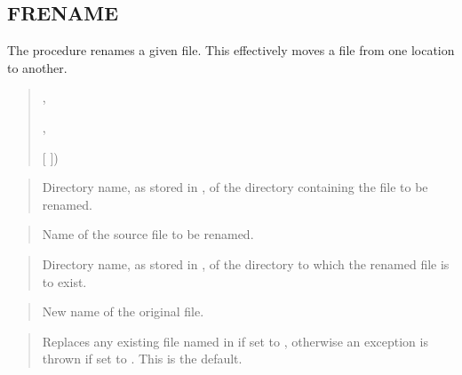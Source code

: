 \documentclass[letterpaper,10pt,english,openany,oneside]{sphinxmanual}
\begin{document}
\subsection{FRENAME}
\label{\detokenize{utl_file:frename}}
The  procedure renames a given file. This effectively moves a
file from one location to another.
\begin{quote}

,

\begin{DUlineblock}{0em}
\item[] ,
\end{DUlineblock}

\begin{DUlineblock}{0em}
\item[] {[}  {]})
\end{DUlineblock}
\end{quote}


\begin{quote}

Directory name, as stored in , of the
directory containing the file to be renamed.
\end{quote}

\begin{quote}

Name of the source file to be renamed.
\end{quote}

\begin{quote}

Directory name, as stored in , of the
directory to which the renamed file is to exist.
\end{quote}

\begin{quote}

New name of the original file.
\end{quote}

\begin{quote}

Replaces any existing file named  in  if set to
, otherwise an exception is thrown if set to . This is the
default.
\end{quote}
\end{document}
